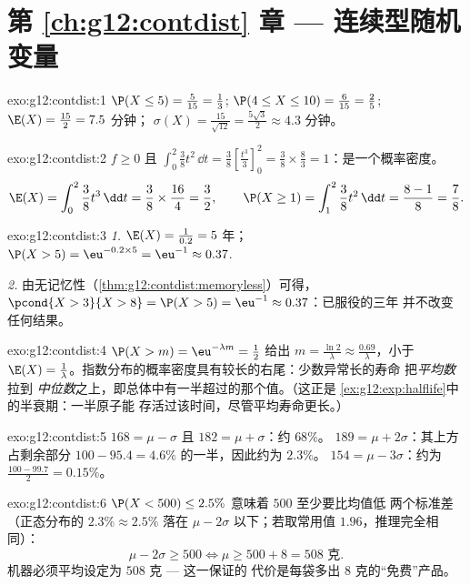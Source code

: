 \section*{第 \ref{ch:g12:contdist} 章 --- 连续型随机变量}

\begin{solution}{exo:g12:contdist:1}
$\P(X \leq 5) = \frac{5}{15} = \frac13$;
$\P(4 \leq X \leq 10) = \frac{6}{15} = \frac25$;
$\E(X) = \frac{15}{2} = 7.5$ 分钟；
$\sigma(X) = \frac{15}{\sqrt{12}} = \frac{5\sqrt3}{2} \approx 4.3$ 分钟。
\end{solution}

\begin{solution}{exo:g12:contdist:2}
$f \geq 0$ 且
$\int_0^2 \frac38 t^2\,\dd t = \frac38\left[\frac{t^3}{3}\right]_0^2
= \frac38 \times \frac83 = 1$：是一个概率密度。
\[
\E(X) = \int_0^2 \frac38 t^3\,\dd t = \frac38 \times \frac{16}{4} = \frac32,
\qquad
\P(X \geq 1) = \int_1^2 \frac38 t^2\,\dd t = \frac{8 - 1}{8} = \frac78 .
\]
\end{solution}

\begin{solution}{exo:g12:contdist:3}
\emph{1.} $\E(X) = \frac{1}{0.2} = 5$ 年；
$\P(X > 5) = \eu^{-0.2\times5} = \eu^{-1} \approx 0.37$.

\emph{2.} 由无记忆性（\cref{thm:g12:contdist:memoryless}）可得，
$\pcond{X > 3}{X > 8} = \P(X > 5) = \eu^{-1} \approx 0.37$：已服役的三年
并不改变任何结果。
\end{solution}

\begin{solution}{exo:g12:contdist:4}
$\P(X > m) = \eu^{-\lambda m} = \frac12$ 给出
$m = \frac{\ln 2}{\lambda} \approx \frac{0.69}{\lambda}$，小于
$\E(X) = \frac1\lambda$。指数分布的概率密度具有较长的右尾：少数异常长的寿命
把\emph{平均数}拉到
\emph{中位数}之上，即总体中有一半超过的那个值。（这正是
\cref{ex:g12:exp:halflife}中的半衰期：一半原子能
存活过该时间，尽管平均寿命更长。）
\end{solution}

\begin{solution}{exo:g12:contdist:5}
$168 = \mu - \sigma$ 且 $182 = \mu + \sigma$：约 $68\%$。
$189 = \mu + 2\sigma$：其上方占剩余部分
$100 - 95.4 = 4.6\%$ 的一半，因此约为 $2.3\%$。
$154 = \mu - 3\sigma$：约为 $\frac{100 - 99.7}{2} = 0.15\%$。
\end{solution}

\begin{solution}{exo:g12:contdist:6}
$\P(X < 500) \leq 2.5\%$ 意味着 $500$ 至少要比均值低
两个标准差（正态分布的 $2.3\% \approx 2.5\%$ 落在
$\mu - 2\sigma$ 以下；若取常用值 $1.96$，推理完全相同）：
\[
\mu - 2\sigma \geq 500 \iff \mu \geq 500 + 8 = 508 \text{ 克}.
\]
机器必须平均设定为 $508$ 克 --- 这一保证的
代价是每袋多出 $8$ 克的“免费”产品。
\end{solution}

